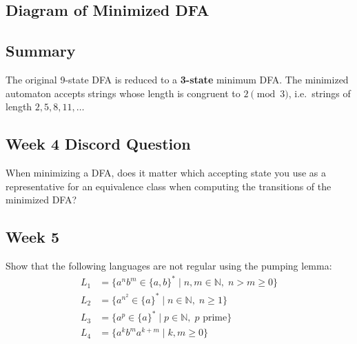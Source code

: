 \documentclass{article}
\theoremstyle{theorem}
\theoremstyle{definition}
\theoremstyle{remark}
\begin{document}
\subsection*{Diagram of Minimized DFA}

\begin{center}
\end{center}

\subsection*{Summary}

The original 9-state DFA is reduced to a \textbf{3-state} minimum DFA. The minimized automaton accepts strings whose length is congruent to $2 \pmod{3}$, i.e.\ strings of length $2, 5, 8, 11, \ldots$

\subsection*{Week 4 Discord Question}
When minimizing a DFA, does it matter which accepting state you use as a representative for an equivalence class when computing the transitions of the minimized DFA?

\subsection{Week 5}

\noindent Show that the following languages are not regular using the pumping lemma:
\begin{align*}
L_1 &= \{a^n b^m \in \{a,b\}^* \mid n, m \in \mathbb{N},\; n > m \geq 0\} \\
L_2 &= \{a^{n^2} \in \{a\}^* \mid n \in \mathbb{N},\; n \geq 1\} \\
L_3 &= \{a^p \in \{a\}^* \mid p \in \mathbb{N},\; p \text{ prime}\} \\
L_4 &= \{a^k b^m a^{k+m} \mid k, m \geq 0\}
\end{align*}
 
\end{document}
